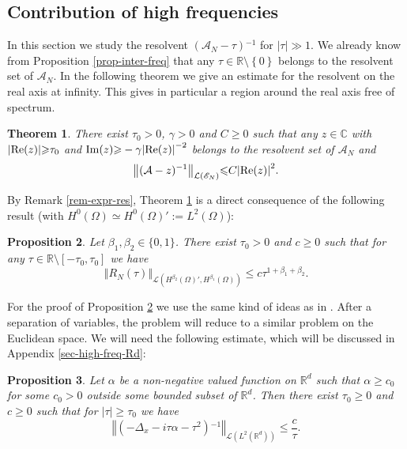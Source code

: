 \documentclass[10pt, a4paper,reqno]{amsart}
\theoremstyle{plain}
\newtheorem{theorem}{{Theorem}}[section]
\newtheorem{proposition}[theorem]{Proposition}
\theoremstyle{definition}
\theoremstyle{remark}
\begin{document}
\subsection{Contribution of high frequencies} \label{sec-high-freq}

In this section we study the resolvent $({{{\mathcal A}}_N}-{\tau}){^{-1}}$ for ${\left\vert {\tau}\right\vert} \gg 1$. We already know from Proposition \ref{prop-inter-freq} that any ${\tau} \in {\mathbb{R}} \setminus {\left\{ 0 \right\}}$ belongs to the resolvent set of ${{{\mathcal A}}_N}$. In the following theorem we give an estimate for the resolvent on the real axis at infinity. This gives in particular a region around the real axis free of spectrum.

\begin{theorem} \label{th-high-freq}
There exist ${\tau}_0 > 0$, ${\gamma} > 0$ and $C {\geqslant} 0$ such that any $z \in {\mathbb{C}}$ with ${\left\vert {{\mathop{\rm{Re}}\nolimits}(z)}\right\vert} {\geqslant} {\tau}_0$ and ${\mathop{\rm{Im}}\nolimits}(z) {\geqslant} - {\gamma} {\left\vert {{\mathop{\rm{Re}}\nolimits}(z)}\right\vert}^{-2}$ belongs to the resolvent set of ${{{\mathcal A}}_N}$ and 
\[
{\left\Vert {({{\mathcal A}}-z){^{-1}}}\right\Vert}_{{{\mathcal L}}({\mathscr E_N})} {\leqslant} C {\left\vert {{\mathop{\rm{Re}}\nolimits}(z)}\right\vert}^2.
\]
\end{theorem}

By Remark \ref{rem-expr-res}, Theorem \ref{th-high-freq} is a direct consequence of the following result (with $H^0({\Omega}) \simeq H^0({\Omega})' := L^2({\Omega})$):

\begin{proposition} \label{prop-RNt-high-freq}
Let ${\beta}_1,{\beta}_2 \in \{0,1\}$. There exist ${\tau}_0 > 0$ and $c {\geqslant} 0$ such that for any ${\tau} \in {\mathbb{R}} \setminus [-{\tau}_0,{\tau}_0]$ we have 
\[
{\left\Vert {R_N({\tau})}\right\Vert}_{{{\mathcal L}}(H^{{\beta}_2}({\Omega})',H^{{\beta}_1}({\Omega}))} {\leqslant} c{\tau}^{1+{\beta}_1+{\beta}_2}.
\]
\end{proposition}

For the proof of Proposition \ref{prop-RNt-high-freq} we use the same kind of ideas as in \cite{Burq-Hi-07}. After a separation of variables, the problem will reduce to a similar problem on the Euclidean space. We will need the following estimate, which will be discussed in Appendix \ref{sec-high-freq-Rd}:

\begin{proposition} \label{prop-estim-res-Rd}
Let ${\alpha}$ be a non-negative valued function on ${\mathbb{R}}^d$ such that ${\alpha} {\geqslant} c_0$ for some $c_0 > 0$ outside some bounded subset of ${\mathbb{R}}^d$. Then there exist ${\tau}_0 {\geqslant} 0$ and $c {\geqslant} 0$ such that for ${\left\vert {\tau}\right\vert} {\geqslant} {\tau}_0$ we have 
\[
{\left\Vert {(-{{\Delta}_x}  - i{\tau} {\alpha} - {\tau}^2){^{-1}}}\right\Vert}_{{{\mathcal L}}(L^2({\mathbb{R}}^d))} {\leqslant} \frac c {\tau}.
\]
\end{proposition}
\end{document}
